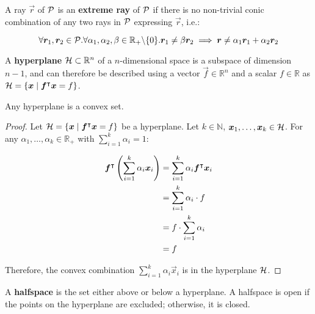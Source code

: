 \begin{definition}
A ray $\vec{r}$ of $\mathcal{P}$ is an \textbf{extreme ray} of $\mathcal{P}$ if there is no non-trivial conic combination of any two rays in $\mathcal{P}$ expressing $\vec{r}$, i.e.:

\begin{equation*}
\forall {\bm{r}}_1, {\bm{r}}_2 \in \mathcal{P}. \forall \alpha_1, \alpha_2, \beta \in \mathbb{R}_+ \backslash \{0\}. {\bm{r}}_1 \neq \beta {\bm{r}}_2 \implies {\bm{r}} \neq \alpha_1 {\bm{r}}_1 + \alpha_2 {\bm{r}}_2
\end{equation*}
\end{definition}

\begin{definition}
A \textbf{hyperplane} $\mathcal{H} \subset \mathbb{R}^n$ of a $n$-dimensional space is a subspace of dimension $n-1$, and can therefore be described using a vector $\vec{f} \in \mathbb{R}^n$ and a scalar $f \in \mathbb{R}$ as $\mathcal{H} = \{{\bm{x}} \mid {\bm{f}}^\intercal {\bm{x}} = f\}$.
\end{definition}

\begin{corollary}
Any hyperplane is a convex set.
\end{corollary}

\begin{proof}
Let $\mathcal{H} = \{{\bm{x}} \mid {\bm{f}}^\intercal {\bm{x}} = f\}$ be a hyperplane. Let $k \in \mathbb{N}$, ${\bm{x}}_1, \dots, {\bm{x}}_k \in \mathcal{H}$. For any $\alpha_1, \dots, \alpha_k \in \mathbb{R}_+$ with $\sum_{i=1}^{k} \alpha_i = 1$:

\begin{align*}
{\bm{f}}^\intercal \left( \sum_{i=1}^{k} \alpha_i {\bm{x}}_i \right)
&= \sum_{i=1}^{k} \alpha_i {\bm{f}}^\intercal {\bm{x}}_i \\
&= \sum_{i=1}^{k} \alpha_i \cdot f \\
&= f \cdot \sum_{i=1}^{k} \alpha_i \\
&= f
\end{align*}

Therefore, the convex combination $\sum_{i=1}^{k} \alpha_i \vec{x}_i$ is in the hyperplane $\mathcal{H}$.
\end{proof}

\begin{definition}
A \textbf{halfspace} is the set either above or below a hyperplane. A halfspace is open if the points on the hyperplane are excluded; otherwise, it is closed.
\end{definition}

